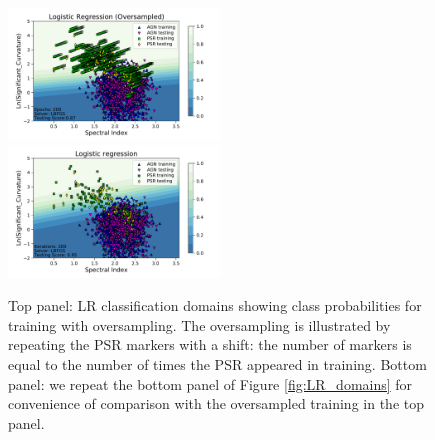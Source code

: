 \begin{figure}[h]
\includegraphics[width=0.5\textwidth]{plots/classification_domains/lr_200_lbfgs_oversample.pdf}
\includegraphics[width=0.5\textwidth]{plots/classification_domains/lr_200_lbfgs.pdf}
\caption{Top panel: LR classification domains showing class probabilities for training with oversampling.
The oversampling is illustrated by repeating the PSR markers with a shift: the number of markers is equal to the number of times the PSR appeared in training.
Bottom panel: we repeat the bottom panel of Figure \ref{fig:LR_domains} for convenience of comparison with the oversampled training in the top panel.
}  
\label{fig:LR_domains_O}
\end{figure}
